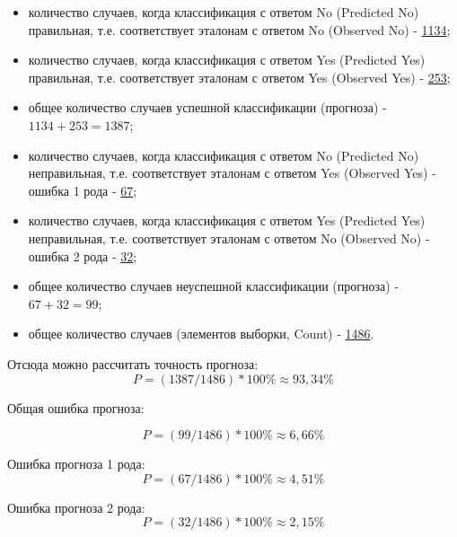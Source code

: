 \begin{itemize}
  \item количество случаев, когда классификация с ответом No (Predicted No) правильная,
  т.е. соответствует эталонам с ответом No (Observed No) - \underline{1134};
  \item количество случаев, когда классификация с ответом Yes (Predicted Yes) правильная,
  т.е. соответствует эталонам с ответом Yes (Observed Yes) - \underline{253};
  \item общее количество случаев успешной классификации (прогноза) - \underline{$1134+253=1387$};
  \item количество случаев, когда классификация с ответом No (Predicted No)
  неправильная, т.е. соответствует эталонам с ответом Yes (Observed Yes) - ошибка 1
  рода - \underline{67};
  \item количество случаев, когда классификация с ответом Yes (Predicted Yes)
  неправильная, т.е. соответствует эталонам с ответом No (Observed No) - ошибка 2
  рода - \underline{32};
  \item общее количество случаев неуспешной классификации (прогноза) - \underline{$67+32=99$};
  \item общее количество случаев (элементов выборки, Count) - \underline{1486}.
\end{itemize}


Отсюда можно рассчитать точность прогноза:
$$
P = (1387 / 1486) * 100\% \approx 93,34\%
$$

Общая ошибка прогноза:

$$
P = (99 / 1486) * 100\% \approx 6,66\%
$$

Ошибка прогноза 1 рода:
$$
P = (67 / 1486) * 100\% \approx 4,51\%
$$

Ошибка прогноза 2 рода:
$$
P = (32 / 1486) * 100\% \approx 2,15\%
$$
